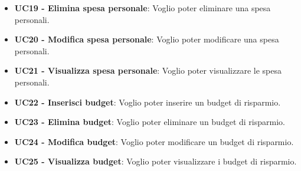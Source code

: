 \begin{itemize}
    \item \textbf{UC19 - Elimina spesa personale}: Voglio poter eliminare una spesa personali.
    \item \textbf{UC20 - Modifica spesa personale}: Voglio poter modificare una spesa personali.
    \item \textbf{UC21 - Visualizza spesa personale}: Voglio poter visualizzare le spesa personali.
    \item \textbf{UC22 - Inserisci budget}: Voglio poter inserire un budget di risparmio.
    \item \textbf{UC23 - Elimina budget}: Voglio poter eliminare un budget di risparmio.
    \item \textbf{UC24 - Modifica budget}: Voglio poter modificare un budget di risparmio.
    \item \textbf{UC25 - Visualizza budget}: Voglio poter visualizzare i budget di risparmio.
\end{itemize}

